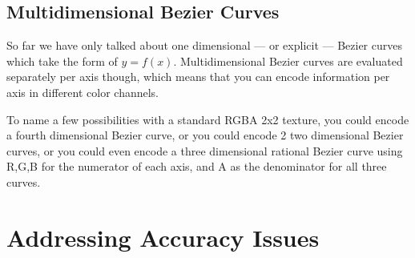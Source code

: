 \documentclass{jcgt}
\begin{document}
\subsection{Multidimensional Bezier Curves}

So far we have only talked about one dimensional --- or explicit --- Bezier curves which take the form of $y=f(x)$.  Multidimensional Bezier curves are evaluated separately per axis though, which means that you can encode information per axis in different color channels.

To name a few possibilities with a standard RGBA 2x2 texture, you could encode a fourth dimensional Bezier curve, or you could encode 2 two dimensional Bezier curves, or you could even encode a three dimensional rational Bezier curve using R,G,B for the numerator of each axis, and A as the denominator for all three curves.

\section{Addressing Accuracy Issues}
\label{sec:addressingaccuracyissues}
\end{document}
